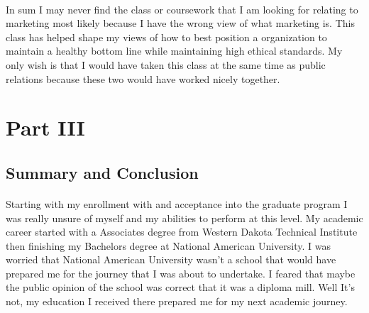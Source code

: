 \documentclass[12pt,titlepage]{article}
\begin{document}
\paragraph {}
In sum I may never find the class or coursework that I am looking for relating to marketing most likely because I have the wrong view of what marketing is. This class has helped shape my views of how to best position a organization to maintain a healthy bottom line while maintaining high ethical standards. My only wish is that I would have taken this class at the same time as public relations because these two would have worked nicely together.


\restoregeometry



\restoregeometry




\section{Part III}
\subsection{Summary and Conclusion}
\paragraph {}
Starting with my enrollment with and acceptance into the graduate program I was really unsure of myself and my abilities to perform at this level. My academic career started with a Associates degree from Western Dakota Technical Institute then finishing my Bachelors degree at National American University. I was worried that National American University wasn't a school that would have prepared me for the journey that I was about to undertake. I feared that maybe the public opinion of the school was correct that it was a diploma mill. Well It's not, my education I received there prepared me for my next academic journey.
\end{document}
